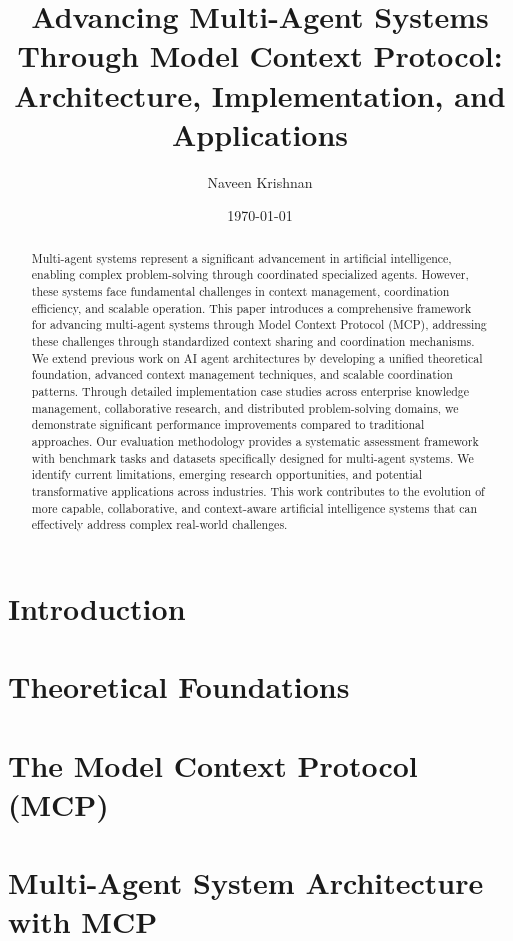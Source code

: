 \documentclass[10pt,a4paper]{article}
\title{Advancing Multi-Agent Systems Through Model Context Protocol: Architecture, Implementation, and Applications}
\author{Naveen Krishnan}
\date{\today}
\begin{document}
\maketitle

\begin{abstract}
Multi-agent systems represent a significant advancement in artificial intelligence, enabling complex problem-solving through coordinated specialized agents. However, these systems face fundamental challenges in context management, coordination efficiency, and scalable operation. This paper introduces a comprehensive framework for advancing multi-agent systems through Model Context Protocol (MCP), addressing these challenges through standardized context sharing and coordination mechanisms. We extend previous work on AI agent architectures by developing a unified theoretical foundation, advanced context management techniques, and scalable coordination patterns. Through detailed implementation case studies across enterprise knowledge management, collaborative research, and distributed problem-solving domains, we demonstrate significant performance improvements compared to traditional approaches. Our evaluation methodology provides a systematic assessment framework with benchmark tasks and datasets specifically designed for multi-agent systems. We identify current limitations, emerging research opportunities, and potential transformative applications across industries. This work contributes to the evolution of more capable, collaborative, and context-aware artificial intelligence systems that can effectively address complex real-world challenges.
\end{abstract}
\section{Introduction}


\section{Theoretical Foundations}


\section{The Model Context Protocol (MCP)}


\section{Multi-Agent System Architecture with MCP}

\end{document}

